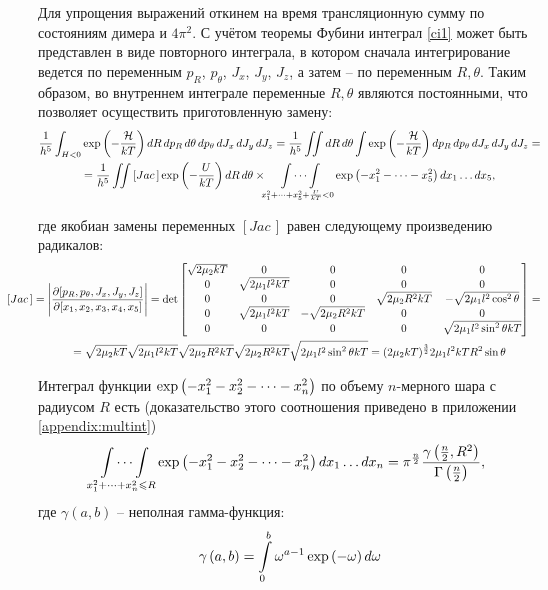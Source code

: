 Для упрощения выражений откинем на время трансляционную сумму по состояниям димера и $4 \pi^2$. С учётом теоремы Фубини интеграл \eqref{ci1} может быть представлен в виде повторного интеграла, в котором сначала интегрирование ведется по переменным $p_R$, $p_\theta$, $J_x$, $J_y$, $J_z$, а затем  -- по переменным $R, \theta$. Таким образом, во внутреннем интеграле переменные $R, \theta$ являются постоянными, что позволяет осуществить приготовленную замену:
\vverh
\begin{gather}
	\frac{1}{h^5} \int_{H < 0} \exp \left( -\frac{\mathcal{H}}{kT} \right) dR \, dp_R \, d \theta \, dp_\theta \, d J_x \, d J_y \, d J_z = \frac{1}{h^5} \iint dR \, d \theta \int \exp \left( -\frac{\mathcal{H}}{kT} \right) d p_R \, d p_\theta \, d J_x \, d J_y \, d J_z = \notag \\
	= \frac{1}{h^5} \iint  \left[ Jac \, \right] \exp \left( -\frac{U}{kT} \right) d R \, d \theta \times \idotsint\limits_{x_1^2 + \dots + x_5^2 + \frac{U}{kT} < 0} \exp \left( - x_1^2 - \dots - x_5^2 \right) dx_1 \dots dx_5, \notag 
\end{gather}

\vlevo где якобиан замены переменных $\left[ Jac \, \right]$ равен следующему произведению радикалов: 
\begin{gather}
	\hspace*{-1.0cm}
	\left[ Jac \, \right] = \Bigg{|} \frac{\partial [p_R, p_\theta, J_x, J_y, J_z]}{\partial [x_1, x_2, x_3, x_4, x_5]} \Bigg{|} = \det  
	\begin{bmatrix}
		\sqrt{2 \mu_2 k T} & 0 & 0 & 0 & 0 \\
		0 & \sqrt{2 \mu_1 l^2 k T} & 0 & 0 & 0 \\
		0 & 0 & 0 & \sqrt{2 \mu_2 R^2 k T} & -\sqrt{2 \mu_1 l^2 \cos^2 \theta} \\
		0 & \sqrt{2 \mu_1 l^2 k T} & -\sqrt{2 \mu_2 R^2 k T} & 0 & 0 \\
		0 & 0 & 0 & 0 & \sqrt{2 \mu_1 l^2 \sin^2 \theta k T}
	\end{bmatrix} = \notag \\
	= \sqrt{2 \mu_2 k T} \sqrt{2 \mu_1 l^2 k T} \sqrt{2 \mu_2 R^2 kT} \sqrt{2 \mu_2 R^2 kT} \sqrt{2 \mu_1 l^2 \sin^2 \theta kT} = (2 \mu_2 kT)^\frac{3}{2} 2\mu_1 l^2 k T R^2 \sin \theta \notag
\end{gather}

Интеграл функции $\exp \left( - x_1^2  - x_2^2 - \dots - x_n^2 \right)$ по объему $n$-мерного шара с радиусом $R$ есть (доказательство этого соотношения приведено в приложении \eqref{appendix:multint})
\vverh
\begin{gather}
	\idotsint\limits_{x_1^2 + \dots + x_n^2 \leqslant R} \exp \left( -x_1^2 - x_2^2 - \dots - x_n^2 \right) d x_1 \dots d x_n = \pi^\frac{n}{2} \frac{\gamma \left( \frac{n}{2}, R^2 \right)}{\Gamma \left( \frac{n}{2} \right)}, \notag
\end{gather}
где $\gamma(a, b)$ -- неполная гамма-функция:
\vverh
\begin{gather}
	\gamma \left( a, b \right) = \int\limits_0^b \omega^{a - 1} \exp \left( - \omega \right) d \omega \notag
\end{gather}

